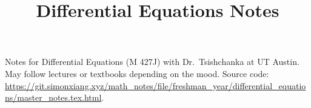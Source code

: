 \documentclass{scrartcl}
\title{Differential Equations Notes}
\date{}
\begin{document}
\maketitle
Notes for Differential Equations (M 427J) with Dr.\ Tsishchanka at UT Austin. May follow lectures or textbooks depending on the mood. Source code: \url{https://git.simonxiang.xyz/math_notes/file/freshman_year/differential_equations/master_notes.tex.html}.
\tableofcontents 
    
\end{document}
